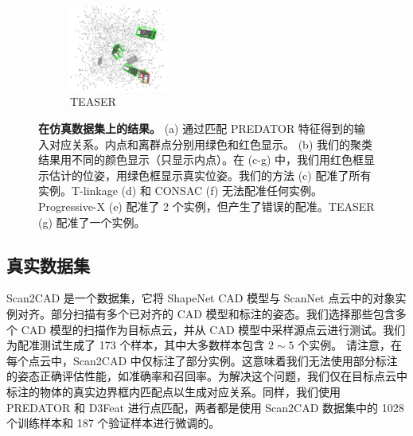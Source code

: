 \begin{figure}[ht]
\begin{subfigure}{0.18\textwidth}
            \centering
            \includegraphics[height=2.8cm]{images/multi-teaser.png}
              \caption{TEASER\cite{yang2020teaser}}
              \label{fig:multi-teaser}
          \end{subfigure}
      
      \caption{\textbf{在仿真数据集上的结果。} (a) 通过匹配 PREDATOR\cite{huang2021predator} 特征得到的输入对应关系。内点和离群点分别用绿色和红色显示。 (b) 我们的聚类结果用不同的颜色显示（只显示内点）。在 (c-g) 中，我们用红色框显示估计的位姿，用绿色框显示真实位姿。我们的方法 (c) 配准了所有实例。T-linkage (d) 和 CONSAC (f) 无法配准任何实例。Progressive-X (e) 配准了 2 个实例，但产生了错误的配准。TEASER (g) 配准了一个实例。}
      \label{fig:predatormm}
\end{figure}

\subsection{真实数据集}
Scan2CAD\cite{avetisyan2019scan2cad} 是一个数据集，它将 ShapeNet\cite{chang2015shapenet} CAD 模型与 ScanNet\cite{dai2017scannet} 点云中的对象实例对齐。部分扫描有多个已对齐的 CAD 模型和标注的姿态。我们选择那些包含多个 CAD 模型的扫描作为目标点云，并从 CAD 模型中采样源点云进行测试。我们为配准测试生成了 173 个样本，其中大多数样本包含 $2 \sim 5$ 个实例。
请注意，在每个点云中，Scan2CAD 中仅标注了部分实例。这意味着我们无法使用部分标注的姿态正确评估性能，如准确率和召回率。为解决这个问题，我们仅在目标点云中标注的物体的真实边界框内匹配点以生成对应关系。同样，我们使用 PREDATOR\cite{huang2021predator} 和 D3Feat\cite{bai2020d3feat} 进行点匹配，两者都是使用 Scan2CAD 数据集中的 1028 个训练样本和 187 个验证样本进行微调的。

